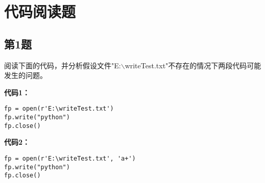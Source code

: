 \section{代码阅读题}

\subsection{第1题}
阅读下面的代码，并分析假设文件"E:$\backslash$writeTest.txt"不存在的情况下两段代码可能发生的问题。

\textbf{代码1：}
\begin{lstlisting}
fp = open(r'E:\writeTest.txt')
fp.write("python")
fp.close()
\end{lstlisting}

\textbf{代码2：}
\begin{lstlisting}
fp = open(r'E:\writeTest.txt', 'a+')
fp.write("python")
fp.close()
\end{lstlisting}

